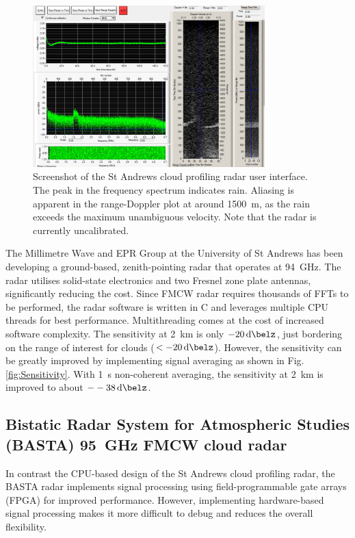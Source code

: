 \documentclass{article}
\begin{document}
\begin{figure}
	\centering
	\includegraphics[width=0.8\textwidth]{gui}
	\caption{Screenshot of the St Andrews cloud profiling radar user interface.\supercite{StAndrewsRadar} The peak in the frequency spectrum indicates rain. Aliasing is apparent in the range-Doppler plot at around \SI{1500}{\metre}, as the rain exceeds the maximum unambiguous velocity. Note that the radar is currently uncalibrated.}
	\label{fig:GUI}
\end{figure}

The Millimetre Wave and EPR Group at the University of St Andrews has been developing a ground-based, zenith-pointing radar that operates at \SI{94}{\giga\hertz}.\supercite{StAndrewsRadar} The radar utilises solid-state electronics and two Fresnel zone plate antennas, significantly reducing the cost.
Since FMCW radar requires thousands of FFTs to be performed, the radar software is written in C and leverages multiple CPU threads for best performance. Multithreading comes at the cost of increased software complexity.\supercite{Cassidy}
The sensitivity at \SI{2}{\kilo\metre} is only \(-\SI{20}{\deci\belz}\), just bordering on the range of interest for clouds (\(< -\SI{20}{\deci\belz}\)). However, the sensitivity can be greatly improved by implementing signal averaging as shown in Fig. \ref{fig:Sensitivity}. With \SI{1}{\second} non-coherent averaging,\supercite{POMRNonCoherentAveraging} the sensitivity at \SI{2}{\kilo\metre} is improved to about \(-\SI{-38}{\deci\belz}\).

\subsection{Bistatic Radar System for Atmospheric Studies (BASTA) \SI{95}{\giga\hertz} FMCW cloud radar}
In contrast the CPU-based design of the St Andrews cloud profiling radar, the BASTA\supercite{BASTA} radar implements signal processing using field-programmable gate arrays (FPGA) for improved performance. However, implementing hardware-based signal processing makes it more difficult to debug and reduces the overall flexibility.\supercite{Cassidy}
\end{document}
